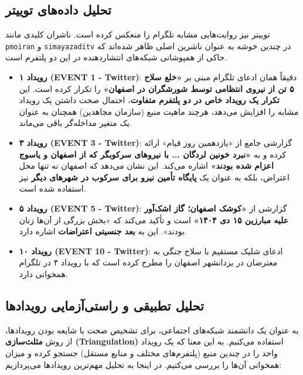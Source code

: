 \documentclass{article}
\begin{document}
	\subsection{تحلیل داده‌های توییتر}
	توییتر نیز روایت‌هایی مشابه تلگرام را منعکس کرده است. ناشران کلیدی مانند \texttt{pmoiran} و \texttt{simayazaditv} در چندین خوشه به عنوان ناشرین اصلی ظاهر شده‌اند که حاکی از همپوشانی شبکه‌های انتشاردهنده در این دو پلتفرم است.
	
	\begin{itemize}
		\item \textbf{رویداد ۱ (EVENT 1 - Twitter)}: دقیقاً همان ادعای تلگرام مبنی بر \textbf{«خلع سلاح ۵ تن از نیروی انتظامی توسط شورشگران در اصفهان»} را تکرار کرده است. این \textbf{تکرار یک رویداد خاص در دو پلتفرم متفاوت}، احتمال صحت داشتن یک رویداد مشابه را افزایش می‌دهد، هرچند ماهیت منبع (سازمان مجاهدین) همچنان به عنوان یک متغیر مداخله‌گر باقی می‌ماند.
		\item \textbf{رویداد ۳ (EVENT 3 - Twitter)}: گزارشی جامع از «یازدهمین روز قیام» ارائه کرده و به \textbf{«نبرد خونین لردگان ... با نیروهای سرکوبگر که از اصفهان و یاسوج اعزام شده بودند»} اشاره می‌کند. این نشان می‌دهد که اصفهان نه تنها محل اعتراض، بلکه به عنوان یک \textbf{پایگاه تأمین نیرو برای سرکوب در شهرهای دیگر} نیز استفاده شده است.
		\item \textbf{رویداد ۵ (EVENT 5 - Twitter)}: گزارشی از \textbf{«کوشک اصفهان؛ گاز اشک‌آور علیه مبارزین ۱۵ دی ۱۴۰۴»} است و تأکید می‌کند که «بخش بزرگی از آن‌ها زنان بودند». این به \textbf{بعد جنسیتی اعتراضات} اشاره دارد.
		\item \textbf{رویداد ۱۰ (EVENT 10 - Twitter)}: ادعای شلیک مستقیم با سلاح جنگی به معترضان در یزدانشهر اصفهان را مطرح کرده است که با رویداد ۴ در تلگرام همخوانی دارد.
	\end{itemize}
	
	\subsection{تحلیل تطبیقی و راستی‌آزمایی رویدادها}
	
	به عنوان یک دانشمند شبکه‌های اجتماعی، برای تشخیص صحت یا شایعه بودن رویدادها، از روش \textbf{مثلث‌سازی (Triangulation)} استفاده می‌کنیم. به این معنا که یک رویداد واحد را در چندین منبع (پلتفرم‌های مختلف و منابع مستقل) جستجو کرده و میزان همخوانی آن‌ها را بررسی می‌کنیم. در اینجا به تحلیل مهم‌ترین رویدادها می‌پردازیم:
	
\end{document}
